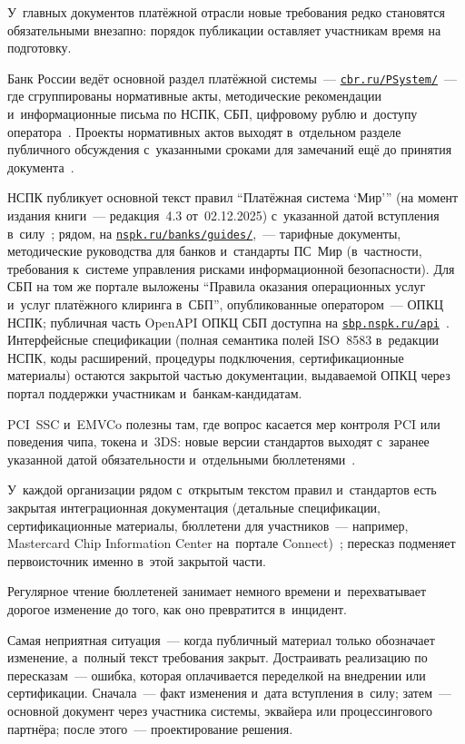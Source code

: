 У~главных документов платёжной отрасли новые требования редко становятся
обязательными внезапно: порядок публикации оставляет участникам время
на подготовку.

Банк России ведёт основной раздел платёжной системы~---
\href{https://www.cbr.ru/PSystem/}{\texttt{cbr.ru/PSystem/}}~--- где
сгруппированы нормативные акты, методические рекомендации и~информационные
письма по НСПК, СБП, цифровому рублю и~доступу оператора~\cite{cbr-ps}. Проекты
нормативных актов выходят в~отдельном разделе публичного обсуждения
с~указанными сроками для замечаний ещё до принятия
документа~\cite{cbr-project-na}.

НСПК публикует основной текст правил \enquote{Платёжная система \enquote{Мир}}
(на момент издания книги~--- редакция~4.3 от~02.12.2025) с~указанной
датой вступления в~силу~\cite{nspk-mir-rules,nspk-mir-rules-v43}; рядом, на
\href{https://nspk.ru/banks/guides/}{\texttt{nspk.ru/banks/guides/}},~---
тарифные документы, методические руководства для банков и~стандарты
ПС~Мир (в~частности, требования к~системе управления рисками
информационной безопасности). Для СБП на том же портале выложены
\enquote{Правила оказания операционных услуг и~услуг платёжного клиринга
в~СБП}, опубликованные оператором~--- ОПКЦ НСПК; публичная часть OpenAPI ОПКЦ
СБП доступна на
\href{https://sbp.nspk.ru/api}{\texttt{sbp.nspk.ru/api}}~\cite{sbp-main,nspk-sbp-openapi}.
Интерфейсные спецификации (полная семантика полей ISO~8583 в~редакции НСПК,
коды расширений, процедуры подключения, сертификационные материалы) остаются
закрытой частью документации, выдаваемой ОПКЦ через портал поддержки участникам
и~банкам-кандидатам.

PCI~SSC и~EMVCo полезны там, где вопрос касается мер контроля PCI или поведения
чипа, токена и~3DS: новые версии стандартов выходят с~заранее указанной датой
обязательности и~отдельными
бюллетенями~\cite{pci-dss-4,pci-faq-1585,pci-format4-suspension,emvco-bulletins-archive}.

У~каждой организации рядом с~открытым текстом правил и~стандартов есть
закрытая интеграционная документация (детальные спецификации, сертификационные
  материалы, бюллетени для участников~--- например, Mastercard Chip Information
Center на~портале Connect)~\cite{mc-chip-info-center}; пересказ подменяет
первоисточник именно в~этой закрытой части.

Регулярное чтение бюллетеней занимает немного времени и~перехватывает дорогое
изменение до того, как оно превратится в~инцидент.

Самая неприятная ситуация~--- когда публичный материал только обозначает
изменение, а~полный текст требования закрыт. Достраивать реализацию по
пересказам~--- ошибка, которая оплачивается переделкой на внедрении или
сертификации. Сначала~--- факт изменения и~дата вступления в~силу; затем~---
основной документ через участника системы, эквайера или процессингового
партнёра; после этого~--- проектирование решения.

